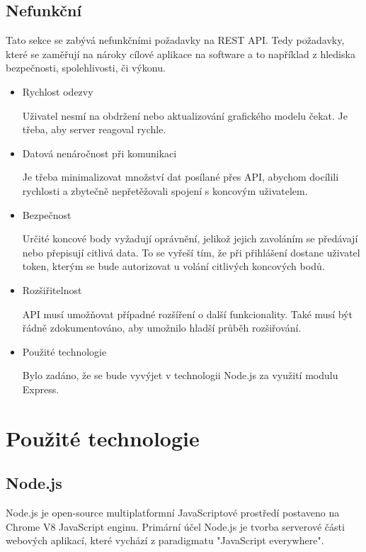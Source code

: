 \documentclass[thesis=B,czech]{FITthesis}[2012/06/26]
\begin{document}
        \subsection{Nefunkční}
            Tato sekce se zabývá nefunkčními požadavky na REST API. Tedy požadavky, které se zaměřují na nároky cílové aplikace na software a to například z hlediska bezpečnosti, spolehlivosti, či výkonu.
            \begin{itemize}
                \item Rychlost odezvy

                    Uživatel nesmí na obdržení nebo aktualizování grafického modelu čekat. Je třeba, aby server reagoval rychle.
                \item Datová nenáročnost při komunikaci

                    Je třeba minimalizovat množství dat posílané přes API, abychom docílili rychlosti a zbytečně nepřetěžovali spojení s koncovým uživatelem.
                \item Bezpečnost
                    
                    Určité koncové body vyžadují oprávnění, jelikož jejich zavoláním se předávají nebo přepisují citlivá data. To se vyřeší tím, že při přihlášení dostane uživatel token, kterým se bude autorizovat u volání citlivých koncových bodů.
                \item Rozšiřitelnost

                    API musí umožňovat případné rozšíření o další funkcionality. Také musí být řádně zdokumentováno, aby umožnilo hladší průběh rozšiřování.
                \item Použité technologie

                    Bylo zadáno, že se bude vyvýjet v technologii Node.js za využití modulu Express.
            \end{itemize}
    \section{Použité technologie}
        \subsection{Node.js}
            Node.js je open-source multiplatformní JavaScriptové prostředí postaveno na Chrome V8 JavaScript enginu. Primární účel Node.js je tvorba serverové části webových aplikací, které vychází z paradigmatu "JavaScript everywhere".
            
\end{document}
